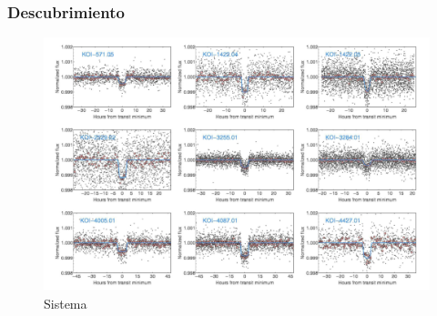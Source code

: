 \documentclass[UKenglish]{beamer}
\begin{document}
\begin{frame}
\frametitle{Descubrimiento}
\begin{figure}[h!]
    \centering
    \includegraphics[scale=0.24]{Imagenes/4}
    \caption{Sistema}
    \label{fig:transicion}
    \end{figure}
\end{frame}
\end{document}
